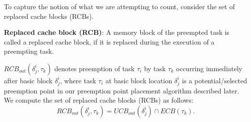 To capture the notion of what we are attempting to count, consider the set of replaced cache blocks (RCBs).

\begin{definition}
\textbf{Replaced cache block (RCB)}: A memory block of the preempted task is called a replaced cache block, if it is replaced during the execution of a preempting task.
\end{definition}

\noindent \begin{math}\textit{RCB}_{out}(\delta_{j}^{i},\tau_{k})\end{math} denotes preemption of task \begin{math}\tau_{i}\end{math} by task \begin{math}\tau_{k}\end{math} occurring immediately after basic block \begin{math}\delta_{j}^{i}\end{math}, where task \begin{math}\tau_{i}\end{math} at basic block location \begin{math}\delta_{j}^{i}\end{math} is a potential/selected preemption point in our preemption point placement algorithm described later.  We compute the set of replaced cache blocks (RCBs) as follows:
\begin{equation}\label{eqn:rcb-formula}
    \textit{RCB}_{out}(\delta_{j}^{i},\tau_{k}) = \textit{UCB}_{out}(\delta_{j}^{i}) \cap \textit{ECB}(\tau_{k}).
\end{equation}
%
